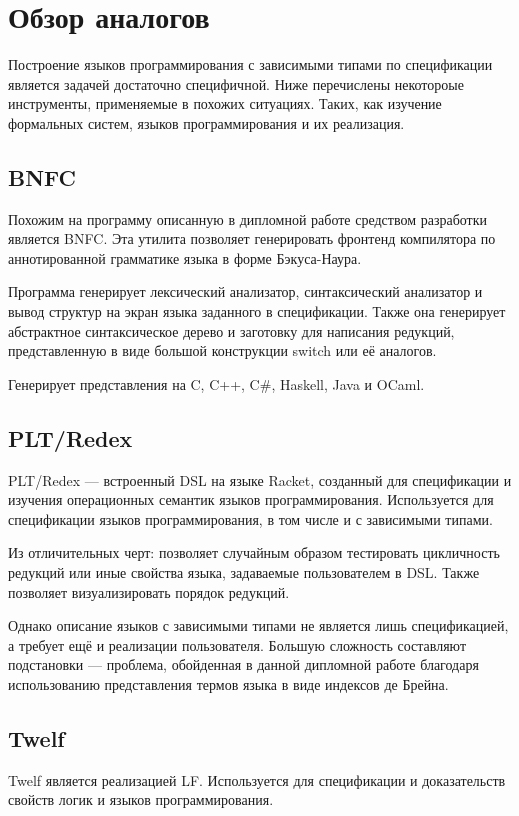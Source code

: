 \section{Обзор аналогов}
Построение языков программирования с зависимыми типами по спецификации является задачей достаточно специфичной. Ниже перечислены некотороые инструменты, применяемые в похожих ситуациях. Таких, как изучение формальных систем, языков программирования и их реализация.

\subsection{BNFC}
Похожим на программу описанную в дипломной работе средством разработки является BNFC\cite{bnfc}. Эта утилита позволяет генерировать фронтенд компилятора по аннотированной грамматике языка в форме Бэкуса-Наура\cite{lbnf}.

Программа генерирует лексический анализатор, синтаксический анализатор и вывод структур на экран языка заданного в спецификации. Также она генерирует абстрактное синтаксическое дерево и заготовку для написания редукций, представленную в виде большой конструкции switch или её аналогов.

Генерирует представления на C, C++, C\#, Haskell, Java и OCaml.

\subsection{PLT/Redex}
PLT/Redex\cite{plt:redex} --- встроенный DSL на языке Racket, созданный для спецификации и изучения операционных семантик языков программирования. Используется для спецификации языков программирования, в том числе и с зависимыми типами.

Из отличительных черт: позволяет случайным образом тестировать цикличность редукций или иные свойства языка, задаваемые пользователем в DSL. Также позволяет визуализировать порядок редукций.

Однако описание языков с зависимыми типами не является лишь спецификацией, а требует ещё и реализации пользователя\cite{plt:ex}. Большую сложность составляют подстановки --- проблема, обойденная в данной дипломной работе благодаря использованию представления термов языка в виде индексов де Брейна.

\subsection{Twelf}
Twelf\cite{twelf} является реализацией LF\cite{Pfenning2002}. Используется для спецификации и доказательств свойств логик и языков программирования.

